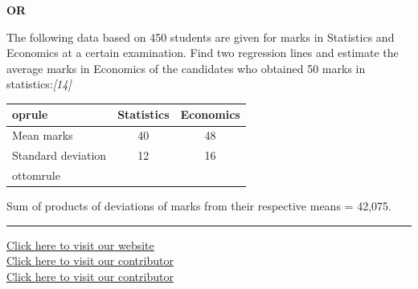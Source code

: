 \documentclass[11pt,a4paper]{article}
\newcommand{\pts}[1]{\hfill   \textit{[#1]}}
\begin{document}
\centerline{   \textbf{OR}}

The following data based on 450 students are given for marks in Statistics and Economics at a certain examination. Find two regression lines and estimate the average marks in Economics of the candidates who obtained 50 marks in statistics:\pts{14}

\begin{center}
  
\begin{tabular}{lcc}
     oprule
    & Statistics & Economics \\
    \midrule
    Mean marks & 40 & 48 \\
    Standard deviation & 12 & 16 \\
    ottomrule
  \end{tabular}
\end{center}
Sum of products of deviations of marks from their respective means = 42,075.

\vfill
\rule{\linewidth}{0.4pt}

\begin{center}\small
\href{https://bhu-exam.vercel.app/}{Click here to visit our website}\\[4pt]
\href{https://me-aryan.vercel.app/}{Click here to visit our contributor}\\[4pt]
\href{https://quashan-me.vercel.app/}{Click here to visit our contributor}
\end{center}
\end{document}
